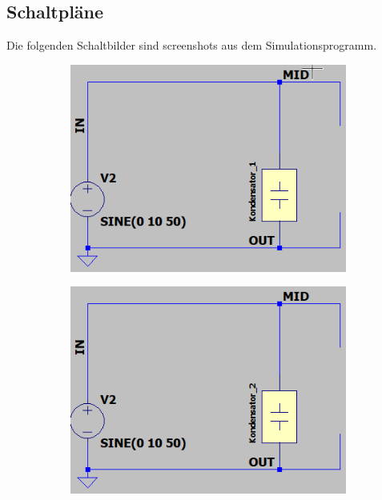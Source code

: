 \documentclass[10pt,a4paper]{article}
\begin{document}
\subsection{Schaltpläne}
\begin{flushleft}
Die folgenden Schaltbilder sind screenshots aus dem Simulationsprogramm.

\begin{figure}[H]
\centering
\begin{subfigure}{0.5\linewidth}
\centering
\includegraphics[scale=0.5]{Schalt_V9_Kond1}
\label{fig:schalt_v9_kond1}
\end{subfigure}%
%
\begin{subfigure}{0.5\linewidth}
\centering
\includegraphics[scale=0.5]{Schalt_V9_Kond2}
\label{fig:schalt_v9_kond2}
\end{subfigure}%


\end{figure}
\end{flushleft}
\end{document}
